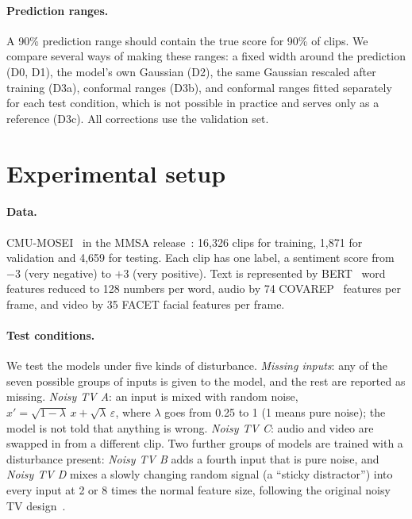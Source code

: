 \documentclass[10pt,twocolumn]{article}
\begin{document}
\paragraph{Prediction ranges.} A 90\% prediction range should contain the true score for 90\% of clips. We compare
several ways of making these ranges: a fixed width around the prediction (D0, D1), the model's own Gaussian (D2), the
same Gaussian rescaled after training (D3a), conformal ranges (D3b), and conformal ranges fitted separately for each test
condition, which is not possible in practice and serves only as a reference (D3c). All corrections use the validation set.

\section{Experimental setup}
\paragraph{Data.} CMU-MOSEI~\cite{zadeh2018mosei} in the MMSA release~\cite{mao2022msena}: 16,326 clips for training,
1,871 for validation and 4,659 for testing. Each clip has one label, a sentiment score from $-3$ (very negative) to $+3$
(very positive). Text is represented by BERT~\cite{devlin2019bert} word features reduced to 128 numbers per word, audio by
74 COVAREP~\cite{degottex2014covarep} features per frame, and video by 35 FACET facial features per frame.

\paragraph{Test conditions.} We test the models under five kinds of disturbance. \emph{Missing inputs}: any of the
seven possible groups of inputs is given to the model, and the rest are reported as missing. \emph{Noisy TV A}: an
input is mixed with random noise, $x'=\sqrt{1-\lambda}\,x+\sqrt{\lambda}\,\varepsilon$, where $\lambda$ goes from 0.25 to
1 (1 means pure noise); the model is not told that anything is wrong. \emph{Noisy TV C}: audio and video are swapped in
from a different clip. Two further groups of models are trained with a disturbance present: \emph{Noisy TV B} adds a
fourth input that is pure noise, and \emph{Noisy TV D} mixes a slowly changing random signal (a ``sticky distractor'')
into every input at 2 or 8 times the normal feature size, following the original noisy TV design~\cite{huang2026vjepa}.
\end{document}
